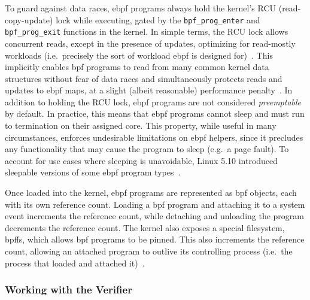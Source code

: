 To guard against data races, \gls{ebpf} programs always hold the kernel's RCU (read-copy-update)
lock while executing, gated by the \texttt{bpf\_prog\_enter} and \texttt{bpf\_prog\_exit}
functions in the kernel. In simple terms, the RCU lock allows concurrent reads, except in
the presence of updates, optimizing for read-mostly workloads (i.e.~precisely the sort of
workload \gls{ebpf} is designed for)~\cite{mckenney2007_rcu}. This implicitly enables \gls{bpf}
programs to read from many common kernel data structures without fear of data races and
simultaneously protects reads and updates to \gls{ebpf} maps, at a slight (albeit reasonable)
performance penalty~\cite{mckenney2007_rcu}. In addition to holding the RCU lock, \gls{ebpf}
programs are not considered \textit{preemptable} by default. In practice, this means that
\gls{ebpf} programs cannot sleep and must run to termination on their assigned core. This
property, while useful in many circumstances, enforces undesirable limitations on \gls{ebpf}
helpers, since it precludes any functionality that may cause the program to sleep (e.g.~a
page fault). To account for use cases where sleeping is unavoidable, Linux 5.10 introduced
sleepable versions of some \gls{ebpf} program types~\cite{starovoitov2020_sleepable}.

Once loaded into the kernel, \gls{ebpf} programs are represented as \gls{bpf} objects, each with its
own reference count. Loading a \gls{bpf} program and attaching it to a system event increments
the reference count, while detaching and unloading the program decrements the reference
count. The kernel also exposes a special filesystem, \gls{bpffs}, which allows \gls{bpf}
programs to be pinned. This also increments the reference count, allowing an attached
program to outlive its controlling process (i.e.~the process that loaded and attached
it)~\cite{gregg2019_bpf}.

\subsubsection*{Working with the Verifier}

